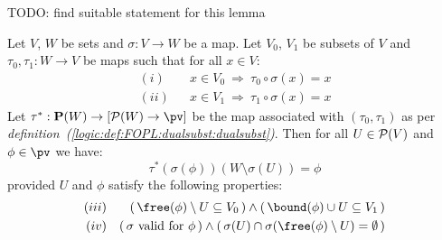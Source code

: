 TODO: find suitable statement for this lemma
\begin{lemma}\label{logic:lemma:FOPL:localinv:lem}
Let $V$, $W$ be sets and $\sigma:V\to W$ be a map. Let $V_{0}$,
$V_{1}$ be subsets of $V$ and $\tau_{0},\tau_{1}:W\to V$ be maps
such that for all $x\in V$:
   \begin{eqnarray*}
    (i)&&x\in V_{0}\ \Rightarrow\ \tau_{0}\circ\sigma(x)=x\\
    (ii)&&x\in V_{1}\ \Rightarrow\ \tau_{1}\circ\sigma(x)=x
    \end{eqnarray*}
Let $\tau^{*}:{\bf P}(W)\to[{\cal P}(W)\to\pv]$ be the map
associated with $(\tau_{0},\tau_{1})$ as per {\em
definition~(\ref{logic:def:FOPL:dualsubst:dualsubst})}. Then for all
$U\in{\cal P}(V)$ and $\phi\in\pv$ we have:
    \begin{equation}\label{logic:eqn:FOPL:localinv:lemma:1}
    \tau^{*}(\sigma(\phi))(W\setminus\sigma(U))=\phi
    \end{equation}
provided $U$ and $\phi$ satisfy the following properties:
    \begin{eqnarray*}
    (iii)&&(\,\free(\phi)\setminus U\subseteq V_{0}\,)
    \land(\,\bound(\phi)\cup U\subseteq V_{1}\,)\\
    (iv)&&(\,\mbox{$\sigma$ valid for $\phi$}\,)\land
    (\,\sigma(U)\cap\sigma(\free(\phi)\setminus U)=\emptyset\,)\\
    \end{eqnarray*}
\end{lemma}
